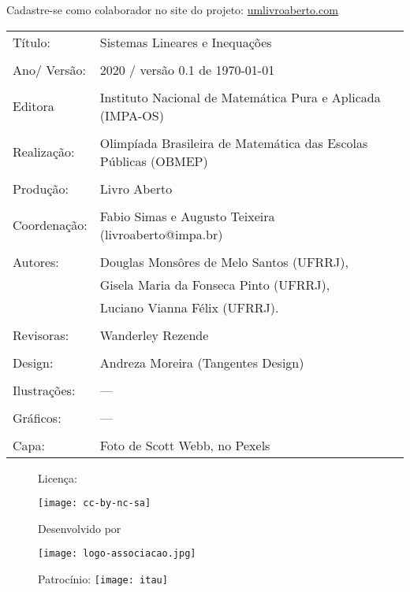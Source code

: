 \vspace*{.3cm}

Cadastre-se como colaborador no site do projeto: \url{umlivroaberto.com}




\begin{tabular}{p{}p{}}
Título: & Sistemas Lineares e Inequações\\
\\
Ano/ Versão: & 2020 / versão 0.1 de \today\\
\\
Editora & Instituto Nacional de Matem\'atica Pura e Aplicada (IMPA-OS)\\
\\
Realização:& Olimp\'iada Brasileira de Matem\'atica das Escolas P\'ublicas (OBMEP)\\
\\
Produção:& Livro Aberto\\
\\
Coordenação:& Fabio Simas e Augusto Teixeira (livroaberto@impa.br)\\
\\
  Autores: & Douglas Monsôres de Melo Santos (UFRRJ),\\
        & Gisela Maria da Fonseca Pinto (UFRRJ),\\
             & Luciano Vianna Félix (UFRRJ).\\
\\
Revisoras: & Wanderley Rezende \\
\\
Design: & Andreza Moreira (Tangentes Design) \\
\\
  Ilustrações: & --- \\ 
\\
Gráficos: & --- \\
\\
  Capa: & Foto de Scott Webb, no Pexels \\

\end{tabular}

\begin{figure}[b]
\begin{minipage}[l]{5cm}
\centering

{\large Licença:}

  \texttt{[image: cc-by-nc-sa]}
\end{minipage}\hfill
\begin{minipage}[c]{5cm}
\centering
{\large Desenvolvido por}

\texttt{[image: logo-associacao.jpg]}
\end{minipage}
\begin{minipage}[r]{5cm}
\centering

{\large Patrocínio:}
  \vspace{1em}
  \texttt{[image: itau]}
\end{minipage}
\end{figure}

